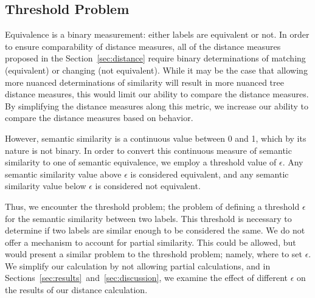 \subsection{Threshold Problem}
\label{sssec:threshold-problem}

Equivalence is a binary measurement: either labels are equivalent or not. In order to ensure comparability of distance measures, all of the distance measures proposed in the Section~\ref{sec:distance} require binary determinations of matching (equivalent) or changing (not equivalent). While it may be the case that allowing more nuanced determinations of similarity will result in more nuanced tree distance measures, this would limit our ability to compare the distance measures. By simplifying the distance measures along this metric, we increase our ability to compare the distance measures based on behavior.

However, semantic similarity is a continuous value between 0 and 1, which by its nature is not binary. In order to convert this continuous measure of semantic similarity to one of semantic equivalence, we employ a threshold value of $\epsilon$. Any semantic similarity value above $\epsilon$ is considered equivalent, and any semantic similarity value below $\epsilon$ is considered not equivalent.

Thus, we encounter the threshold problem; the problem of defining a threshold $\epsilon$ for the semantic similarity between two labels. This threshold is necessary to determine if two labels are similar enough to be considered the same. We do not offer a mechanism to account for partial similarity. This could be allowed, but would present a similar problem to the threshold problem; namely, where to set $\epsilon$. We simplify our calculation by not allowing partial calculations, and in Sections~\ref{sec:results}~and~\ref{sec:discussion}, we examine the effect of different $\epsilon$ on the results of our distance calculation.
